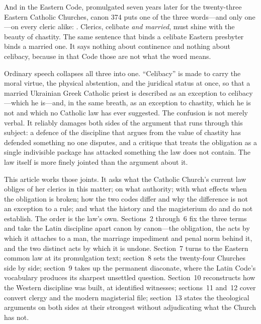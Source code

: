 And in the Eastern Code, promulgated seven years later for the twenty-three Eastern Catholic Churches, canon 374 puts one of the three words---and only one---on every cleric alike: . Clerics, celibate \emph{and married}, must shine with the beauty of chastity. The same sentence that binds a celibate Eastern presbyter binds a married one. It says nothing about continence and nothing about celibacy, because in that Code those are not what the word means.

Ordinary speech collapses all three into one. ``Celibacy'' is made to carry the moral virtue, the physical abstention, and the juridical status at once, so that a married Ukrainian Greek Catholic priest is described as an exception to celibacy---which he is---and, in the same breath, as an exception to chastity, which he is not and which no Catholic law has ever suggested. The confusion is not merely verbal. It reliably damages both sides of the argument that runs through this subject: a defence of the discipline that argues from the value of chastity has defended something no one disputes, and a critique that treats the obligation as a single indivisible package has attacked something the law does not contain. The law itself is more finely jointed than the argument about it.

This article works those joints. It asks what the Catholic Church's current law obliges of her clerics in this matter; on what authority; with what effects when the obligation is broken; how the two codes differ and why the difference is not an exception to a rule; and what the history and the magisterium do and do not establish. The order is the law's own. Sections~2 through~6 fix the three terms and take the Latin discipline apart canon by canon---the obligation, the acts by which it attaches to a man, the marriage impediment and penal norm behind it, and the two distinct acts by which it is undone. Section~7 turns to the Eastern common law at its promulgation text; section~8 sets the twenty-four Churches  side by side; section~9 takes up the permanent diaconate, where the Latin Code's vocabulary produces its sharpest unsettled question. Section~10 reconstructs how the Western discipline was built, at identified witnesses; sections~11 and~12 cover convert clergy and the modern magisterial file; section~13 states the theological arguments on both sides at their strongest without adjudicating what the Church has not.

